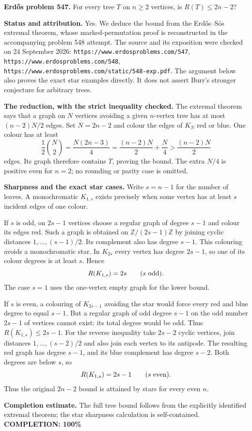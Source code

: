 \textbf{Erd\H{o}s problem 547.}
For every tree $T$ on $n\geq2$ vertices, is $R(T)\leq2n-2$?

\textbf{Status and attribution.}
Yes. We deduce the bound from the Erd\H{o}s--S\'os extremal theorem, whose marked-permutation proof is reconstructed in the accompanying problem 548 attempt. The source and its exposition were checked on 24 September 2026:
\texttt{https://www.erdosproblems.com/547},
\texttt{https://www.erdosproblems.com/548},
\texttt{https://www.erdosproblems.com/static/548-exp.pdf}.
The argument below also proves the exact star examples directly. It does not assert Burr's stronger conjecture for arbitrary trees.

\textbf{The reduction, with the strict inequality checked.}
The extremal theorem says that a graph on $N$ vertices avoiding a given $n$-vertex tree has at most $(n-2)N/2$ edges. Set $N=2n-2$ and colour the edges of $K_N$ red or blue. One colour has at least
\[
 \frac12\binom N2=\frac{N(2n-3)}4
 =\frac{(n-2)N}{2}+\frac N4
 >\frac{(n-2)N}{2}
\]
edges. Its graph therefore contains $T$, proving the bound. The extra $N/4$ is positive even for $n=2$; no rounding or parity case is omitted.

\textbf{Sharpness and the exact star cases.}
Write $s=n-1$ for the number of leaves. A monochromatic $K_{1,s}$ exists precisely when some vertex has at least $s$ incident edges of one colour.

If $s$ is odd, on $2s-1$ vertices choose a regular graph of degree $s-1$ and colour its edges red. Such a graph is obtained on $\mathbb Z/(2s-1)\mathbb Z$ by joining cyclic distances $1,\ldots,(s-1)/2$. Its complement also has degree $s-1$. This colouring avoids a monochromatic star. In $K_{2s}$ every vertex has degree $2s-1$, so one of its colour degrees is at least $s$. Hence
\[
 R(K_{1,s})=2s\qquad(s\ \hbox{odd}).
\]
The case $s=1$ uses the one-vertex empty graph for the lower bound.

If $s$ is even, a colouring of $K_{2s-1}$ avoiding the star would force every red and blue degree to equal $s-1$. But a regular graph of odd degree $s-1$ on the odd number $2s-1$ of vertices cannot exist: its total degree would be odd. Thus $R(K_{1,s})\leq2s-1$.
For the reverse inequality take $2s-2$ cyclic vertices, join distances $1,\ldots,(s-2)/2$ and also join each vertex to its antipode. The resulting red graph has degree $s-1$, and its blue complement has degree $s-2$. Both degrees are below $s$, so
\[
 R(K_{1,s})=2s-1\qquad(s\ \hbox{even}).
\]
Thus the original $2n-2$ bound is attained by stars for every even $n$.

\textbf{Completion estimate.}
The full tree bound follows from the explicitly identified extremal theorem; the star sharpness calculation is self-contained.
\textbf{COMPLETION: 100\%}
